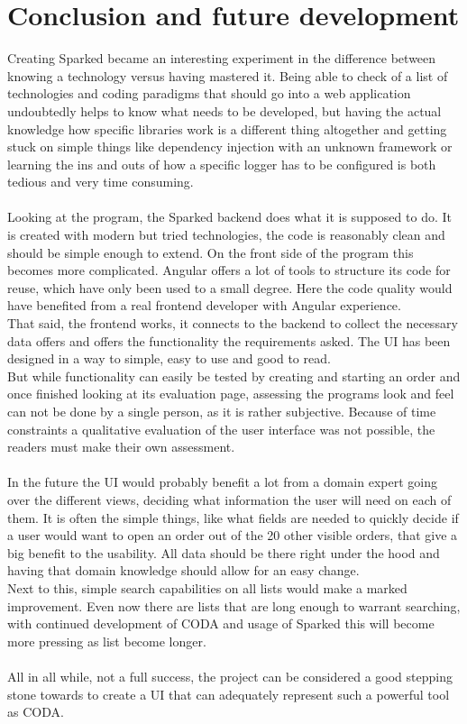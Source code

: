 \chapter{Conclusion and future development}
Creating Sparked became an interesting experiment in the difference between knowing a technology versus having mastered it. Being able to check of a list of technologies and coding paradigms that should go into a web application undoubtedly helps to know what needs to be developed, but having the actual knowledge how specific libraries work is a different thing altogether and getting stuck on simple things like dependency injection with an unknown framework or learning the ins and outs of how a specific logger has to be configured is both tedious and very time consuming. \\\\
Looking at the program, the Sparked backend does what it is supposed to do. It is created with modern but tried technologies, the code is reasonably clean and should be simple enough to extend. On the front side of the program this becomes more complicated. Angular offers a lot of tools to structure its code for reuse, which have only been used to a small degree. Here the code quality would have benefited from a real frontend developer with Angular experience. \\
That said, the frontend works, it connects to the backend to collect the necessary data offers and offers the functionality the requirements asked. The UI has been designed in a way to simple, easy to use and good to read. \\
But while functionality can easily be tested by creating and starting an order and once finished looking at its evaluation page, assessing the programs look and feel can not be done by a single person, as it is rather subjective. Because of time constraints a qualitative evaluation of the user interface was not possible, the readers must make their own assessment.\\\\

In the future the UI would probably benefit a lot from a domain expert going over the different views, deciding what information the user will need on each of them. It is often the simple things, like what fields are needed to quickly decide if a user would want to open an order out of the 20 other visible orders, that give a big benefit to the usability. All data should be there right under the hood and having that domain knowledge should allow for an easy change.\\
Next to this, simple search capabilities on all lists would make a marked improvement. Even now there are lists that are long enough to warrant searching, with continued development of CODA and usage of Sparked this will become more pressing as list become longer. \\\\

All in all while, not a full success, the project can be considered a good stepping stone towards to create a UI that can adequately represent such a powerful tool as CODA.

